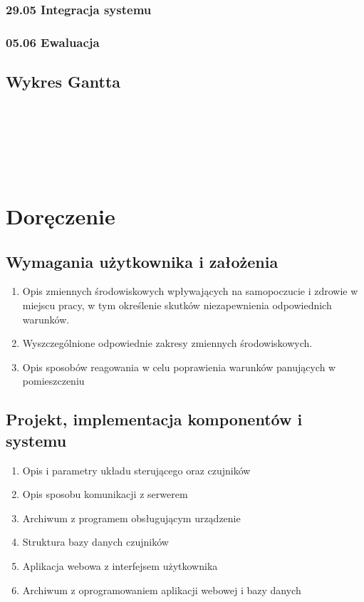 \documentclass[10pt, a4paper]{article}
\begin{document}
\subsubsection{29.05 Integracja systemu}
\subsubsection{05.06 Ewaluacja}

\subsection{Wykres Gantta}

\hspace{-60px}
\begin{ganttchart}{1}{33}
 \\
 \\
 \\
 \\
 \\
\end{ganttchart}


\section{Doręczenie}

\subsection{Wymagania użytkownika i założenia}
	\begin{enumerate}
	\item Opis zmiennych środowiskowych wpływających na samopoczucie i zdrowie w miejscu pracy, w tym określenie skutków niezapewnienia odpowiednich warunków.
	\item Wyszczególnione odpowiednie zakresy zmiennych środowiskowych.
	\item Opis sposobów reagowania w celu poprawienia warunków panujących w pomieszczeniu
	\end{enumerate}
\subsection{Projekt, implementacja komponentów i systemu}
	\begin{enumerate}
	\item Opis i parametry układu sterującego oraz czujników
	\item Opis sposobu komunikacji z serwerem
	\item Archiwum z programem obsługującym urządzenie
	\item Struktura bazy danych czujników
	\item Aplikacja webowa z interfejsem użytkownika
	\item Archiwum z oprogramowaniem aplikacji webowej i bazy danych
	\end{enumerate}
\end{document}
